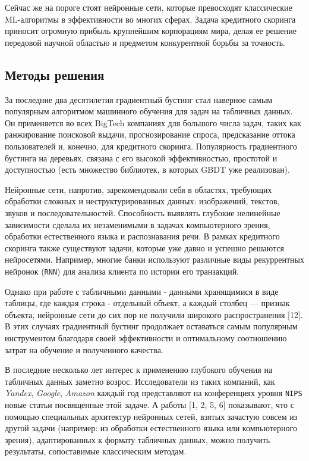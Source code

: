 \documentclass[12pt]{article}
\begin{document}
Сейчас же на пороге стоят нейронные сети, которые превосходят классические ML-алгоритмы в эффективности во многих сферах. Задача кредитного скоринга приносит огромную прибыль крупнейшим корпорациям мира, делая ее решение передовой научной областью и предметом конкурентной борьбы за точность.

\newpage
\subsection{Методы решения}

За последние два десятилетия градиентный бустинг стал наверное самым популярным алгоритмом машинного обучения для задач на табличных данных. Он применяется во всех BigTech компаниях для большого числа задач, таких как ранжирование поисковой выдачи, прогнозирование спроса, предсказание оттока пользователей и, конечно, для кредитного скоринга. Популярность градиентного бустинга на деревьях, связана с его высокой эффективностью, простотой и доступностью (есть множество библиотек, в которых GBDT уже реализован).

Нейронные сети, напротив, зарекомендовали себя в областях, требующих обработки сложных и неструктурированных данных: изображений, текстов, звуков и последовательностей. Способность выявлять глубокие нелинейные зависимости сделала их незаменимыми в задачах компьютерного зрения, обработки естественного языка и распознавания речи. В рамках кредитного скоринга также существуют задачи, которые уже давно и успешно решаются нейросетями. Например, многие банки используют различные виды рекуррентных нейронок (\texttt{RNN}) для анализа клиента по истории его транзакций.

Однако при работе с табличными данными - данными хранящимися в виде таблицы, где каждая строка - отдельный объект, а каждый столбец — признак объекта, нейронные сети до сих пор не получили широкого распространения [12]. В этих случаях градиентный бустинг продолжает оставаться самым популярным инструментом благодаря своей эффективности и оптимальному соотношению затрат на обучение и полученного качества.

В последние несколько лет интерес к применению глубокого обучения на табличных данных заметно возрос. Исследователи из таких компаний, как \textit{Yandex}, \textit{Google}, \textit{Amazon} каждый год представляют на конференциях уровня \texttt{NIPS} новые статьи посвященные этой задаче. А работы [1, 2, 5, 6] показывают, что с помощью специальных архитектур нейронных сетей, взятых зачастую совсем из другой задачи (например: из обработки естественного языка или компьютерного зрения), адаптированных к формату табличных данных, можно получить результаты, сопоставимые классическим методам.
\end{document}
